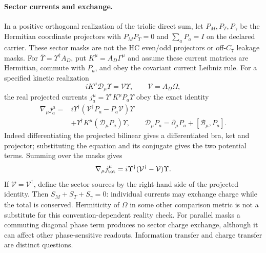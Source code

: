 \paragraph{Sector currents and exchange.}
In a positive orthogonal realization of the triolic direct sum, let
$P_M,P_T,P_\gamma$ be the Hermitian coordinate projectors with
$P_MP_T=0$ and $\sum_aP_a=I$ on the declared carrier. These sector
masks are not the HC even/odd projectors or off-$C_7$ leakage masks.
For $\bar\Upsilon=\Upsilon^\dagger A_D$, put
$K^\mu=A_D\Gamma^\mu$ and assume these current matrices are Hermitian,
commute with $P_a$, and obey the covariant current Leibniz rule.
For a specified kinetic realization
\[
  iK^\mu\mathcal D_\mu\Upsilon=\mathcal V\Upsilon,
  \qquad \mathcal V=A_D\Omega,
\]
the real projected currents $j_a^\mu=\Upsilon^\dagger K^\mu P_a\Upsilon$
obey the exact identity
\[
\begin{aligned}
  \nabla_\mu j_a^\mu={}&
  i\Upsilon^\dagger(\mathcal V^\dagger P_a-P_a\mathcal V)\Upsilon\\
  &+\Upsilon^\dagger K^\mu(\mathcal D_\mu P_a)\Upsilon,
  \qquad
  \mathcal D_\mu P_a=\partial_\mu P_a+[\mathcal B_\mu,P_a].
\end{aligned}
\]
Indeed differentiating the projected bilinear gives a differentiated
bra, ket and projector; substituting the equation and its conjugate
gives the two potential terms. Summing over the masks gives
\[
  \nabla_\mu j_{\rm tot}^\mu
  =i\Upsilon^\dagger(\mathcal V^\dagger-\mathcal V)\Upsilon.
\]
If $\mathcal V=\mathcal V^\dagger$, define the sector sources by the
right-hand side of the projected identity. Then
$S_M+S_T+S_\gamma=0$: individual currents may exchange charge while
the total is conserved. Hermiticity of $\Omega$ in some other comparison
metric is not a substitute for this convention-dependent reality check.
For parallel masks a commuting diagonal phase term produces no sector
charge exchange, although it can affect other phase-sensitive readouts.
Information transfer and charge transfer are distinct questions.

